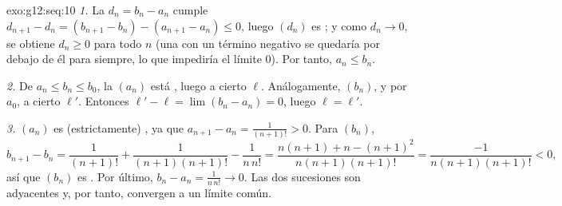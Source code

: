 \begin{solution}{exo:g12:seq:10}
\emph{1.} La  $d_n = b_n - a_n$ cumple
$d_{n+1} - d_n = (b_{n+1} - b_n) - (a_{n+1} - a_n) \leq 0$, luego $(d_n)$
es ; y como $d_n \to 0$, se obtiene $d_n \geq 0$ para todo $n$
(una   con un término negativo se quedaría por debajo
de él para siempre, lo que impediría el límite $0$). Por tanto,
$a_n \leq b_n$.

\emph{2.} De $a_n \leq b_n \leq b_0$, la   $(a_n)$ está
, luego  a cierto $\ell$. Análogamente,
$(b_n)$,  y  por $a_0$,  a cierto
$\ell'$. Entonces $\ell' - \ell = \lim (b_n - a_n) = 0$, luego
$\ell = \ell'$.

\emph{3.} $(a_n)$ es (estrictamente) , ya que
$a_{n+1} - a_n = \frac{1}{(n+1)!} > 0$. Para $(b_n)$,
\[
b_{n+1} - b_n = \frac{1}{(n+1)!} + \frac{1}{(n+1)(n+1)!} - \frac{1}{n\,n!}
= \frac{n(n+1) + n - (n+1)^2}{n(n+1)(n+1)!}
= \frac{-1}{n(n+1)(n+1)!} < 0 ,
\]
así que $(b_n)$ es . Por último,
$b_n - a_n = \frac{1}{n\,n!} \to 0$. Las dos sucesiones son adyacentes y,
por tanto, convergen a un límite común.
\end{solution}

